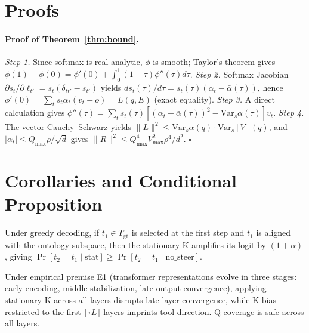 \appendix
\section{Proofs}\label{app:proofs}

\paragraph{Proof of Theorem~\ref{thm:bound}.}\label{app:proof:bound}
\emph{Step 1.} Since softmax is real-analytic, $\phi$ is smooth; Taylor's theorem gives $\phi(1) - \phi(0) = \phi'(0) + \int_0^1(1-\tau)\phi''(\tau)d\tau$.
\emph{Step 2.} Softmax Jacobian $\partial s_t/\partial\ell_{t'} = s_t(\delta_{tt'}-s_{t'})$ yields $ds_t(\tau)/d\tau = s_t(\tau)(\alpha_t - \bar\alpha(\tau))$, hence $\phi'(0) = \sum_t s_t \alpha_t(v_t - o) = L(q,E)$ (exact equality).
\emph{Step 3.} A direct calculation gives $\phi''(\tau) = \sum_t s_t(\tau)[(\alpha_t - \bar\alpha(\tau))^2 - \mathrm{Var}_s\alpha(\tau)] v_t$.
\emph{Step 4.} The vector Cauchy--Schwarz yields $\|L\|^2 \le \mathrm{Var}_s\alpha(q)\cdot\mathrm{Var}_s[V](q)$, and $|\alpha_t| \le Q_{\max}\rho/\sqrt d$ gives $\|R\|^2 \le Q_{\max}^4 V_{\max}^2 \rho^4/d^2$. $\square$

\section{Corollaries and Conditional Proposition}\label{app:corollaries}

\begin{corollary}\label{cor:seka-repeat}
Under greedy decoding, if $t_1 \in T_{\mathrm{gt}}$ is selected at the first step and $t_1$ is aligned with the ontology subspace, then the stationary K amplifies its logit by $(1+\alpha)$, giving $\Pr[t_2 = t_1 \mid \text{stat}] \ge \Pr[t_2 = t_1 \mid \text{no\_steer}]$.
\end{corollary}

\begin{proposition}\label{prop:ladapt-intuition}
Under empirical premise E1 (transformer representations evolve in three stages: early encoding, middle stabilization, late output convergence), applying stationary K across all layers disrupts late-layer convergence, while K-bias restricted to the first $\lfloor \tau L\rfloor$ layers imprints tool direction. Q-coverage is safe across all layers.
\end{proposition}

